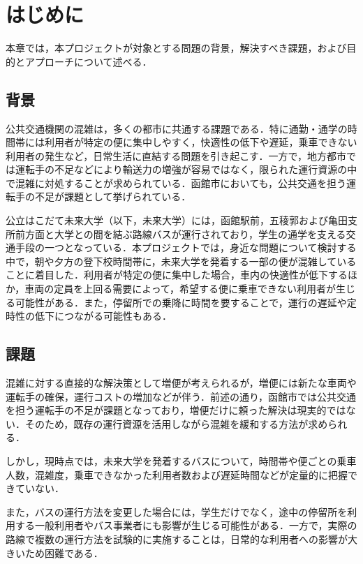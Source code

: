 \chapter{はじめに}
本章では，本プロジェクトが対象とする問題の背景，解決すべき課題，および目的とアプローチについて述べる．

\section{背景}
公共交通機関の混雑は，多くの都市に共通する課題である．特に通勤・通学の時間帯には利用者が特定の便に集中しやすく，快適性の低下や遅延，乗車できない利用者の発生など，日常生活に直結する問題を引き起こす．一方で，地方都市では運転手の不足などにより輸送力の増強が容易ではなく，限られた運行資源の中で混雑に対処することが求められている\cite{ref:mlit}．函館市においても，公共交通を担う運転手の不足が課題として挙げられている\cite{ref:hakodate-plan}．

公立はこだて未来大学（以下，未来大学）には，函館駅前，五稜郭および亀田支所前方面と大学との間を結ぶ路線バスが運行されており，学生の通学を支える交通手段の一つとなっている\cite{ref:fun-access}．本プロジェクトでは，身近な問題について検討する中で，朝や夕方の登下校時間帯に，未来大学を発着する一部の便が混雑していることに着目した．利用者が特定の便に集中した場合，車内の快適性が低下するほか，車両の定員を上回る需要によって，希望する便に乗車できない利用者が生じる可能性がある．また，停留所での乗降に時間を要することで，運行の遅延や定時性の低下につながる可能性もある．

\section{課題}
混雑に対する直接的な解決策として増便が考えられるが，増便には新たな車両や運転手の確保，運行コストの増加などが伴う．前述の通り，函館市では公共交通を担う運転手の不足が課題となっており，増便だけに頼った解決は現実的ではない．そのため，既存の運行資源を活用しながら混雑を緩和する方法が求められる．

しかし，現時点では，未来大学を発着するバスについて，時間帯や便ごとの乗車人数，混雑度，乗車できなかった利用者数および遅延時間などが定量的に把握できていない．

また，バスの運行方法を変更した場合には，学生だけでなく，途中の停留所を利用する一般利用者やバス事業者にも影響が生じる可能性がある．一方で，実際の路線で複数の運行方法を試験的に実施することは，日常的な利用者への影響が大きいため困難である．

